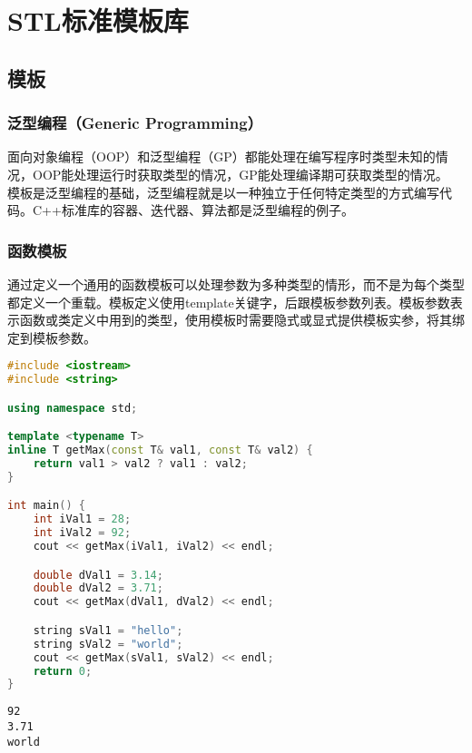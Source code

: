 \chapter{STL标准模板库}

\section{模板}

\subsection{泛型编程（Generic Programming）}

面向对象编程（OOP）和泛型编程（GP）都能处理在编写程序时类型未知的情况，OOP能处理运行时获取类型的情况，GP能处理编译期可获取类型的情况。\\

模板是泛型编程的基础，泛型编程就是以一种独立于任何特定类型的方式编写代码。C++标准库的容器、迭代器、算法都是泛型编程的例子。\\

\subsection{函数模板}

通过定义一个通用的函数模板可以处理参数为多种类型的情形，而不是为每个类型都定义一个重载。模板定义使用template关键字，后跟模板参数列表。模板参数表示函数或类定义中用到的类型，使用模板时需要隐式或显式提供模板实参，将其绑定到模板参数。\\


\begin{lstlisting}[language=C++]
#include <iostream>
#include <string>

using namespace std;

template <typename T>
inline T getMax(const T& val1, const T& val2) {
    return val1 > val2 ? val1 : val2;
}

int main() {
    int iVal1 = 28;
    int iVal2 = 92;
    cout << getMax(iVal1, iVal2) << endl;

    double dVal1 = 3.14;
    double dVal2 = 3.71;
    cout << getMax(dVal1, dVal2) << endl;

    string sVal1 = "hello";
    string sVal2 = "world";
    cout << getMax(sVal1, sVal2) << endl;
    return 0;
}
\end{lstlisting}

\begin{tcolorbox}
	\begin{verbatim}
92
3.71
world
	\end{verbatim}
\end{tcolorbox}

